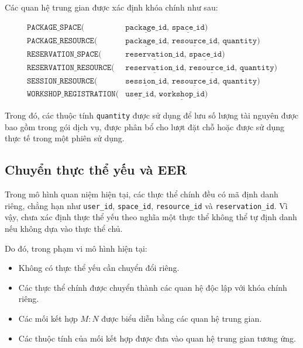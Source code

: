 Các quan hệ trung gian được xác định khóa chính như sau:

\begin{align*}
\texttt{PACKAGE\_SPACE}
(&\underline{\texttt{package\_id}},\,
\underline{\texttt{space\_id}})\\
\texttt{PACKAGE\_RESOURCE}
(&\underline{\texttt{package\_id}},\,
\underline{\texttt{resource\_id}},\,
\texttt{quantity})\\
\texttt{RESERVATION\_SPACE}
(&\underline{\texttt{reservation\_id}},\,
\underline{\texttt{space\_id}})\\
\texttt{RESERVATION\_RESOURCE}
(&\underline{\texttt{reservation\_id}},\,
\underline{\texttt{resource\_id}},\,
\texttt{quantity})\\
\texttt{SESSION\_RESOURCE}
(&\underline{\texttt{session\_id}},\,
\underline{\texttt{resource\_id}},\,
\texttt{quantity})\\
\texttt{WORKSHOP\_REGISTRATION}
(&\underline{\texttt{user\_id}},\,
\underline{\texttt{workshop\_id}})
\end{align*}

Trong đó, các thuộc tính \texttt{quantity} được sử dụng để lưu số lượng tài nguyên được bao gồm trong gói dịch vụ, được phân bổ cho lượt đặt chỗ hoặc được sử dụng thực tế trong một phiên sử dụng.

\subsection{Chuyển thực thể yếu và EER}

Trong mô hình quan niệm hiện tại, các thực thể chính đều có mã định danh riêng, chẳng hạn như \texttt{user\_id}, \texttt{space\_id}, \texttt{resource\_id} và \texttt{reservation\_id}. Vì vậy, chưa xác định thực thể yếu theo nghĩa một thực thể không thể tự định danh nếu không dựa vào thực thể chủ.

Do đó, trong phạm vi mô hình hiện tại:

\begin{itemize}
    \item Không có thực thể yếu cần chuyển đổi riêng.
    \item Các thực thể chính được chuyển thành các quan hệ độc lập với khóa chính riêng.
    \item Các mối kết hợp \(M:N\) được biểu diễn bằng các quan hệ trung gian.
    \item Các thuộc tính của mối kết hợp được đưa vào quan hệ trung gian tương ứng.
\end{itemize}

